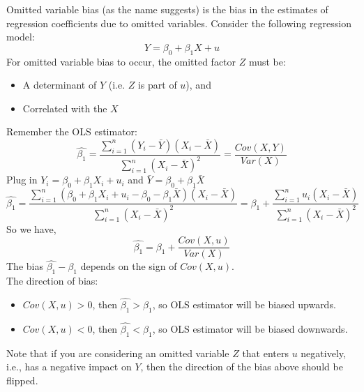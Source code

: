 \documentclass{./../../Latex/handout}
\begin{document}
\thispagestyle{plain}
\newcommand{\mytitle}{Omitted Variable Bias}
\myheader{\mytitle}

Omitted variable bias (as the name suggests) is the bias in the estimates of regression coefficients due to omitted variables. Consider the following regression model:
$$ Y = \beta_0 + \beta_1 X + u $$
For omitted variable bias to occur, the omitted factor $Z$ must be:
\begin{itemize}
  \item A determinant of $Y$ (i.e. $Z$ is part of $u$), and
  \item Correlated with the $X$ 
\end{itemize}

Remember the OLS estimator:
 $$ \hat{\beta_1} = \frac{ \sum_{i=1}^n(Y_i - \bar{Y})(X_i-\bar{X})}{ \sum_{i=1}^n(X_i - \bar{X})^2 } = \frac{Cov(X,Y)}{Var(X)} $$
Plug in $Y_i = \beta_0 + \beta_1 X_i + u_i$ and $\bar{Y}= \beta_0 + \beta_1 \bar{X} $
 $$ \hat{\beta_1} =  \frac{ \sum_{i=1}^n(\beta_0 + \beta_1 X_i + u_i - \beta_0 - \beta_1 \bar{X})(X_i-\bar{X})}{ \sum_{i=1}^n(X_i - \bar{X})^2 } = \beta_1 + \frac{ \sum_{i=1}^n u_i (X_i-\bar{X})}{ \sum_{i=1}^n(X_i - \bar{X})^2 }  $$
 So we have, 
 $$ \hat{\beta_1} = \beta_1 + \frac{Cov(X,u)}{Var(X)} $$
 The bias $ \hat{\beta_1}- \beta_1$ depends on the sign of $Cov(X,u)$. \\
 
 The direction of bias:
\begin{itemize}
  \item $Cov(X,u)>0$, then $\hat{\beta_1}>\beta_1$, so OLS estimator will be biased upwards. 
  \item $Cov(X,u)<0$, then $\hat{\beta_1}<\beta_1$, so OLS estimator will be biased downwards.
\end{itemize}
Note that if you are considering an omitted variable $Z$ that enters $u$ negatively, i.e., has a negative impact on $Y$, then the direction of the bias above should be flipped. 
\end{document}
